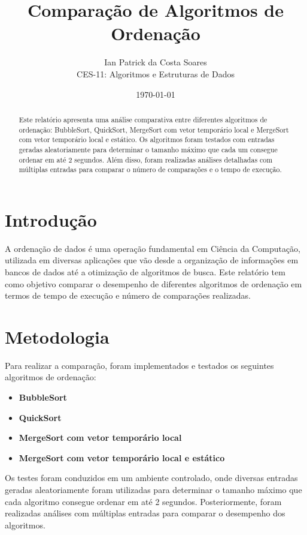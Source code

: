 \documentclass[a4paper,12pt]{article}
\title{Comparação de Algoritmos de Ordenação}
\author{Ian Patrick da Costa Soares \\ CES-11: Algoritmos e Estruturas de Dados}
\date{\today}
\begin{document}
\maketitle

\begin{abstract}
    Este relatório apresenta uma análise comparativa entre diferentes algoritmos de ordenação: BubbleSort, QuickSort, MergeSort com vetor temporário local e MergeSort com vetor temporário local e estático. Os algoritmos foram testados com entradas geradas aleatoriamente para determinar o tamanho máximo que cada um consegue ordenar em até 2 segundos. Além disso, foram realizadas análises detalhadas com múltiplas entradas para comparar o número de comparações e o tempo de execução.
\end{abstract}

\tableofcontents
\newpage

\section{Introdução}

A ordenação de dados é uma operação fundamental em Ciência da Computação, utilizada em diversas aplicações que vão desde a organização de informações em bancos de dados até a otimização de algoritmos de busca. Este relatório tem como objetivo comparar o desempenho de diferentes algoritmos de ordenação em termos de tempo de execução e número de comparações realizadas.

\section{Metodologia}

Para realizar a comparação, foram implementados e testados os seguintes algoritmos de ordenação:

\begin{itemize}
    \item \textbf{BubbleSort}
    \item \textbf{QuickSort}
    \item \textbf{MergeSort com vetor temporário local}
    \item \textbf{MergeSort com vetor temporário local e estático}
\end{itemize}

Os testes foram conduzidos em um ambiente controlado, onde diversas entradas geradas aleatoriamente foram utilizadas para determinar o tamanho máximo que cada algoritmo consegue ordenar em até 2 segundos. Posteriormente, foram realizadas análises com múltiplas entradas para comparar o desempenho dos algoritmos.
\end{document}
